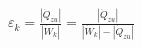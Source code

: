 \( \varepsilon_k = \frac{|\dot{Q}_{zu}|}{|\dot{W}_{k}|} = \frac{|\dot{Q}_{zu}|}{|\dot{W}_{k}| - |\dot{Q}_{zu}|} \)
